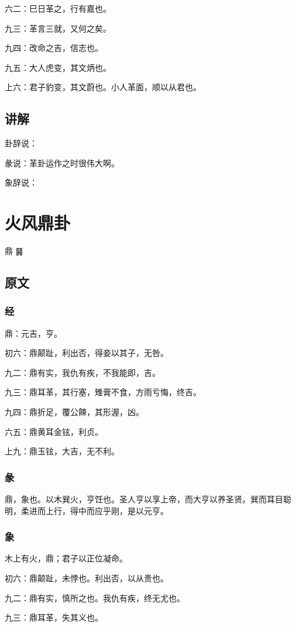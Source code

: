 \documentclass[12pt,oneside]{book}
\begin{document}
六二：巳日革之，行有嘉也。

九三：革言三就，又何之矣。

九四：改命之吉，信志也。

九五：大人虎变，其文炳也。

上六：君子豹变，其文蔚也。小人革面，顺以从君也。

\section{讲解}
卦辞说：

彖说：革卦运作之时很伟大啊。

象辞说：

\chapter{火风鼎卦}
鼎 {\large ䷱}
\section{原文}

\subsection{经}
鼎：元吉，亨。

初六：鼎颠趾，利出否，得妾以其子，无咎。

九二：鼎有实，我仇有疾，不我能即，吉。

九三：鼎耳革，其行塞，雉膏不食，方雨亏悔，终吉。

九四：鼎折足，覆公餗，其形渥，凶。

六五：鼎黄耳金铉，利贞。

上九：鼎玉铉，大吉，无不利。

\subsection{彖}
鼎，象也。以木巽火，亨饪也。圣人亨以享上帝，而大亨以养圣贤。巽而耳目聪明，柔进而上行，得中而应乎刚，是以元亨。

\subsection{象}
木上有火，鼎；君子以正位凝命。

初六：鼎颠趾，未悖也。利出否，以从贵也。

九二：鼎有实，慎所之也。我仇有疾，终无尤也。

九三：鼎耳革，失其义也。
\end{document}
